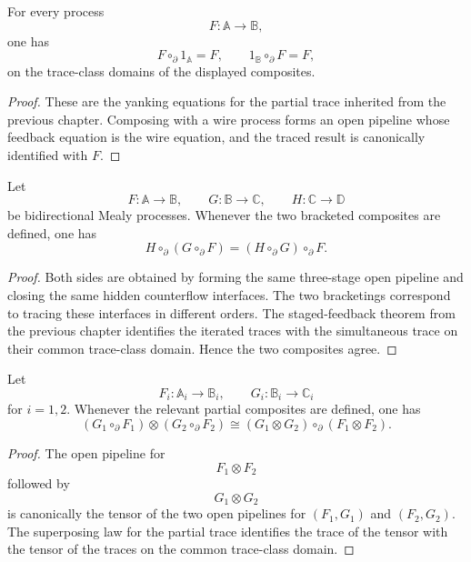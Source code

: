 \begin{proposition}
\label{prop:identity-cut}
For every process
\[
F:\mathbb A\to\mathbb B,
\]
one has
\[
F\circ_{\partial}1_{\mathbb A}=F,
\qquad
1_{\mathbb B}\circ_{\partial}F=F,
\]
on the trace-class domains of the displayed composites.
\end{proposition}

\begin{proof}
These are the yanking equations for the partial trace inherited from the
previous chapter.  Composing with a wire process forms an open pipeline whose
feedback equation is the wire equation, and the traced result is canonically
identified with \(F\).
\end{proof}

\begin{proposition}
\label{prop:associativity-partial-cut}
Let
\[
F:\mathbb A\to\mathbb B,
\qquad
G:\mathbb B\to\mathbb C,
\qquad
H:\mathbb C\to\mathbb D
\]
be bidirectional Mealy processes.  Whenever the two bracketed composites are
defined, one has
\[
H\circ_{\partial}(G\circ_{\partial}F)
=
(H\circ_{\partial}G)\circ_{\partial}F.
\]
\end{proposition}

\begin{proof}
Both sides are obtained by forming the same three-stage open pipeline and
closing the same hidden counterflow interfaces.  The two bracketings correspond
to tracing these interfaces in different orders.  The staged-feedback theorem
from the previous chapter identifies the iterated traces with the simultaneous
trace on their common trace-class domain.  Hence the two composites agree.
\end{proof}

\begin{proposition}
\label{prop:tensor-compatibility-partial-cut}
Let
\[
F_i:\mathbb A_i\to\mathbb B_i,
\qquad
G_i:\mathbb B_i\to\mathbb C_i
\]
for \(i=1,2\).  Whenever the relevant partial composites are defined, one has
\[
(G_1\circ_{\partial}F_1)\otimes(G_2\circ_{\partial}F_2)
\cong
(G_1\otimes G_2)\circ_{\partial}(F_1\otimes F_2).
\]
\end{proposition}

\begin{proof}
The open pipeline for
\[
F_1\otimes F_2
\]
followed by
\[
G_1\otimes G_2
\]
is canonically the tensor of the two open pipelines for \((F_1,G_1)\) and
\((F_2,G_2)\).  The superposing law for the partial trace identifies the trace
of the tensor with the tensor of the traces on the common trace-class domain.
\end{proof}

